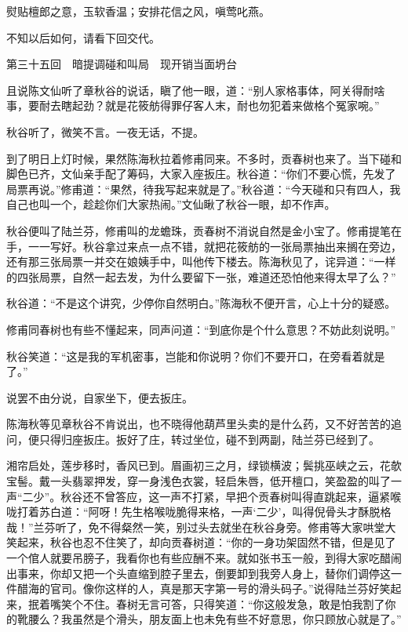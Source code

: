 \documentclass[12pt,UTF8]{ctexbook}
\begin{document}
{{{熨贴檀郎之意，玉软香温；安排花信之风，嗔莺叱燕。

不知以后如何，请看下回交代。





第三十五回　暗提调碰和叫局　现开销当面坍台





且说陈文仙听了章秋谷的说话，瞋了他一眼，道：“别人家格事体，阿关得耐啥事，要耐去瞎起劲？就是花筱舫得罪仔客人末，耐也勿犯着来做格个冤家啘。”

秋谷听了，微笑不言。一夜无话，不提。

到了明日上灯时候，果然陈海秋拉着修甫同来。不多时，贡春树也来了。当下碰和脚色已齐，文仙亲手配了筹码，大家入座扳庄。秋谷道：“你们不要心慌，先发了局票再说。”修甫道：“果然，待我写起来就是了。”秋谷道：“今天碰和只有四人，我自己也叫一个，趁趁你们大家热闹。”文仙瞅了秋谷一眼，却不作声。

秋谷便叫了陆兰芬，修甫叫的龙蟾珠，贡春树不消说自然是金小宝了。修甫提笔在手，一一写好。秋谷拿过来点一点不错，就把花筱舫的一张局票抽出来搁在旁边，还有那三张局票一并交在娘姨手中，叫他传下楼去。陈海秋见了，诧异道：“一样的四张局票，自然一起去发，为什么要留下一张，难道还恐怕他来得太早了么？”

秋谷道：“不是这个讲究，少停你自然明白。”陈海秋不便开言，心上十分的疑惑。

修甫同春树也有些不懂起来，同声问道：“到底你是个什么意思？不妨此刻说明。”

秋谷笑道：“这是我的军机密事，岂能和你说明？你们不要开口，在旁看着就是了。”

说罢不由分说，自家坐下，便去扳庄。

陈海秋等见章秋谷不肯说出，也不晓得他葫芦里头卖的是什么药，又不好苦苦的追问，便只得归座扳庄。扳好了庄，转过坐位，碰不到两副，陆兰芬已经到了。

湘帘启处，莲步移时，香风已到。眉画初三之月，绿锁横波；鬓挑巫峡之云，花欹宝髻。戴一头翡翠押发，穿一身浅色衣裳，轻启朱唇，低开檀口，笑盈盈的叫了一声“二少”。秋谷还不曾答应，这一声不打紧，早把个贡春树叫得直跳起来，逼紧喉咙打着苏白道：“阿呀！先生格喉咙脆得来格，一声‘二少’，叫得倪骨头才酥脱格哉！”兰芬听了，免不得粲然一笑，别过头去就坐在秋谷身旁。修甫等大家哄堂大笑起来，秋谷也忍不住笑了，却向贡春树道：“你的一身功架固然不错，但是见了一个倌人就要吊膀子，我看你也有些应酬不来。就如张书玉一般，到得大家吃醋闹出事来，你却又把一个头直缩到腔子里去，倒要卸到我旁人身上，替你们调停这一件醋海的官司。像你这样的人，真是那天字第一号的滑头码子。”说得陆兰芬好笑起来，抿着嘴笑个不住。春树无言可答，只得笑道：“你这般发急，敢是怕我割了你的靴腰么？我虽然是个滑头，朋友面上也未免有些不好意思，你只顾放心就是了。”

}}}
\end{document}
